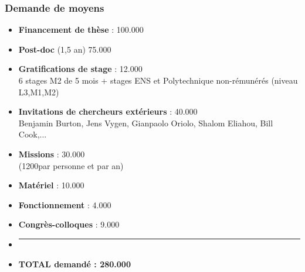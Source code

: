 \documentclass[a4paper,compress]{beamer}  %
\theoremstyle{definition}
\begin{document}
\begin{frame}
  \frametitle{Demande de moyens}
\begin{itemize}
\item[] {\bf Financement de thèse} : \hfill 100.000 \EUR\\
\item[] {\bf Post-doc} (1,5 an) \hfill 75.000 \EUR\\
\item[] {\bf Gratifications de stage} : \hfill 12.000 \EUR\\
{\footnotesize 6 stages M2 de 5 mois + stages ENS et Polytechnique non-rémunérés (niveau L3,M1,M2)}
\item[] {\bf Invitations de chercheurs extérieurs} : \hfill 40.000 \EUR\\
{\footnotesize Benjamin Burton, Jens Vygen, Gianpaolo Oriolo, Shalom Eliahou, Bill Cook,...
}
\item[] {\bf Missions} : \hfill 30.000 \EUR\\
{\footnotesize (1200\EUR par personne et par an)}
\item[] {\bf Matériel} : \hfill 10.000 \EUR
\item[] {\bf Fonctionnement} : \hfill 4.000 \EUR
\item[] {\bf Congrès-colloques} : \hfill 9.000 \EUR
\item[] \rule[-0.1cm]{\linewidth}{0.01cm} 
\item[] {\bf TOTAL demandé : \hfill 280.000 \EUR}
\end{itemize}
\end{frame}
\end{document}
